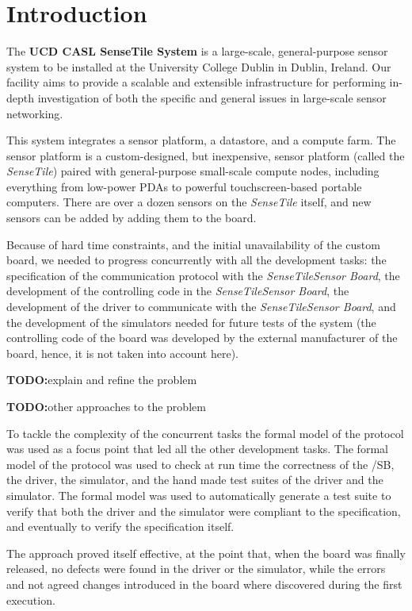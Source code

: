 \documentclass{article}
\newcommand{\todo}{\textbf{TODO:}}
\newcommand{\ST}{\emph{SenseTile}\xspace}
\newcommand{\STSB}{\ST \emph{Sensor Board}\xspace}
\begin{document}
\section{Introduction}

The \textbf{UCD CASL SenseTile System} is a large-scale, general-purpose
sensor system to be installed at the University College Dublin in Dublin,
Ireland. 
Our facility aims to provide a scalable and extensible 
infrastructure for performing in-depth investigation of both the specific 
and general issues in large-scale sensor networking.

This system integrates a sensor platform, a datastore, and a compute
farm.  
The sensor platform is a custom-designed, but inexpensive,
sensor platform (called the \ST) paired with general-purpose
small-scale compute nodes, including everything from low-power PDAs to
powerful touchscreen-based portable computers. 
There are over a dozen
sensors on the \ST itself, and new sensors can be added by adding them
to the board.

Because of hard time constraints, and the initial unavailability of the 
custom board, we needed to progress concurrently with all the development tasks: 
the specification of the communication protocol with the \STSB, the development of 
the controlling code in the \STSB, the development of the driver to communicate 
with the \STSB, and the development of the simulators needed for future tests 
of the system (the controlling code of the board was developed by the external 
manufacturer of the board, hence, it is not taken into account here).

\todo explain and refine the problem

\todo other approaches to the problem

To tackle the complexity of the concurrent tasks the formal model of the protocol 
was used as a focus point that led all the other development tasks. 
The formal model of the protocol was used to check at run time the correctness of 
the /SB, the driver, the simulator, and the hand made test suites of the driver 
and the simulator.
The formal model was used to automatically generate a test suite to verify that
both the driver and the simulator were compliant to the specification, and eventually 
to verify the specification itself.

The approach proved itself effective, at the point that, when the board was finally 
released, no defects were found in the driver or the simulator, while the errors and 
not agreed changes introduced in the board where discovered during the first execution.
\end{document}
